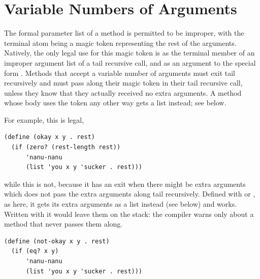



\section{Variable Numbers of Arguments} \label{sec:varargs}

The formal parameter list of a method is permitted to be improper,
with the terminal atom being a magic token representing the rest of
the arguments.  Natively, the only legal use for this magic token is
as the terminal member of an improper argument list of a tail
recursive call, and as an argument to the special form
.  Methods that accept a variable number of arguments
must exit tail recursively and must pass along their magic token in
their tail recursive call, unless they know that they actually
received no extra arguments.  A method whose body uses the token any
other way gets a list instead; see below.


For example, this is legal,
\begin{verbatim}
(define (okay x y . rest)
  (if (zero? (rest-length rest))
      'nanu-nanu
      (list 'you x y 'sucker . rest)))
\end{verbatim}
while this is not, because it has an exit when there might be extra
arguments which does not pass the extra arguments along tail
recursively.  Defined with  or , as here, it
gets its extra arguments as a list instead (see below) and works.
Written with  it would leave them on the stack: the
compiler warns only about a method that never passes them along.
\begin{verbatim}
(define (not-okay x y . rest)
  (if (eq? x y)
      'nanu-nanu
      (list 'you x y 'sucker . rest)))
\end{verbatim}


